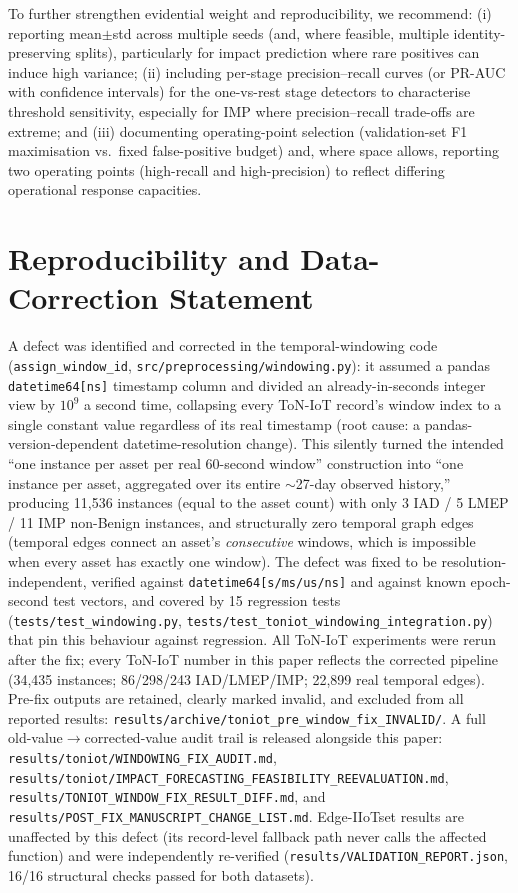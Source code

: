 \documentclass[pdflatex,sn-mathphys-num]{sn-jnl}
\theoremstyle{thmstyleone}%
\theoremstyle{thmstyletwo}%
\theoremstyle{thmstylethree}%
\begin{document}
To further strengthen evidential weight and reproducibility, we recommend:
(i) reporting mean$\pm$std across multiple seeds (and, where feasible, multiple identity-preserving splits), particularly for impact prediction where rare positives can induce high variance;
(ii) including per-stage precision--recall curves (or PR-AUC with confidence intervals) for the one-vs-rest stage detectors to characterise threshold sensitivity, especially for IMP where precision--recall trade-offs are extreme; and
(iii) documenting operating-point selection (validation-set F1 maximisation vs.\ fixed false-positive budget) and, where space allows, reporting two operating points (high-recall and high-precision) to reflect differing operational response capacities.


\section{Reproducibility and Data-Correction Statement}
\label{sec:reproducibility_statement}
A defect was identified and corrected in the temporal-windowing code (\texttt{assign\_window\_id}, \texttt{src/preprocessing/windowing.py}): it assumed a pandas \texttt{datetime64[ns]} timestamp column and divided an already-in-seconds integer view by $10^9$ a second time, collapsing every ToN-IoT record's window index to a single constant value regardless of its real timestamp (root cause: a pandas-version-dependent datetime-resolution change). This silently turned the intended ``one instance per asset per real 60-second window'' construction into ``one instance per asset, aggregated over its entire $\sim$27-day observed history,'' producing 11,536 instances (equal to the asset count) with only 3 IAD / 5 LMEP / 11 IMP non-Benign instances, and structurally zero temporal graph edges (temporal edges connect an asset's \emph{consecutive} windows, which is impossible when every asset has exactly one window). The defect was fixed to be resolution-independent, verified against \texttt{datetime64[s/ms/us/ns]} and against known epoch-second test vectors, and covered by 15 regression tests (\texttt{tests/test\_windowing.py}, \texttt{tests/test\_toniot\_windowing\_integration.py}) that pin this behaviour against regression. All ToN-IoT experiments were rerun after the fix; every ToN-IoT number in this paper reflects the corrected pipeline (34,435 instances; 86/298/243 IAD/LMEP/IMP; 22,899 real temporal edges). Pre-fix outputs are retained, clearly marked invalid, and excluded from all reported results: \texttt{results/archive/toniot\_pre\_window\_fix\_INVALID/}. A full old-value$\to$corrected-value audit trail is released alongside this paper: \texttt{results/toniot/WINDOWING\_FIX\_AUDIT.md}, \texttt{results/toniot/IMPACT\_FORECASTING\_FEASIBILITY\_REEVALUATION.md}, \texttt{results/TONIOT\_WINDOW\_FIX\_RESULT\_DIFF.md}, and \texttt{results/POST\_FIX\_MANUSCRIPT\_CHANGE\_LIST.md}. Edge-IIoTset results are unaffected by this defect (its record-level fallback path never calls the affected function) and were independently re-verified (\texttt{results/VALIDATION\_REPORT.json}, 16/16 structural checks passed for both datasets).
\end{document}
